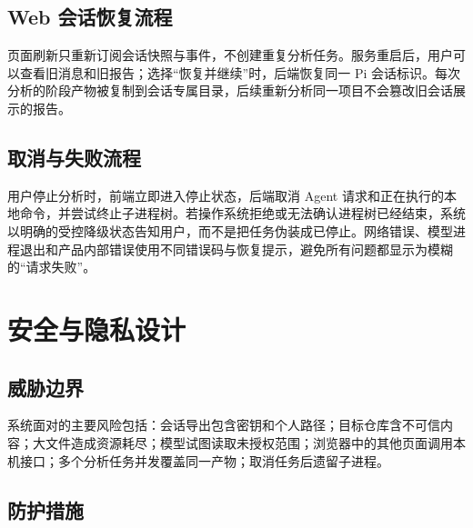 \documentclass[UTF8,a4paper,12pt]{ctexart}
\begin{document}
\subsection{Web 会话恢复流程}

页面刷新只重新订阅会话快照与事件，不创建重复分析任务。服务重启后，用户可以查看旧消息和旧报告；选择“恢复并继续”时，后端恢复同一 Pi 会话标识。每次分析的阶段产物被复制到会话专属目录，后续重新分析同一项目不会篡改旧会话展示的报告。

\subsection{取消与失败流程}

用户停止分析时，前端立即进入停止状态，后端取消 Agent 请求和正在执行的本地命令，并尝试终止子进程树。若操作系统拒绝或无法确认进程树已经结束，系统以明确的受控降级状态告知用户，而不是把任务伪装成已停止。网络错误、模型进程退出和产品内部错误使用不同错误码与恢复提示，避免所有问题都显示为模糊的“请求失败”。

\section{安全与隐私设计}

\subsection{威胁边界}

系统面对的主要风险包括：会话导出包含密钥和个人路径；目标仓库含不可信内容；大文件造成资源耗尽；模型试图读取未授权范围；浏览器中的其他页面调用本机接口；多个分析任务并发覆盖同一产物；取消任务后遗留子进程。

\subsection{防护措施}
\end{document}
